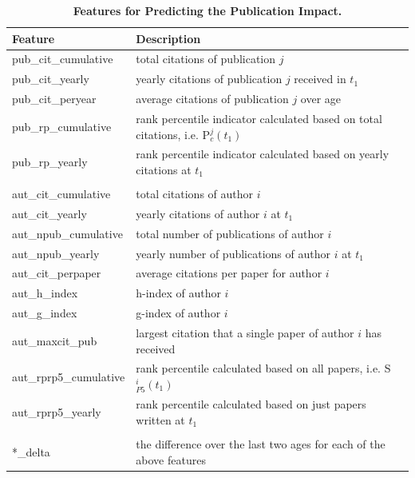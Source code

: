 \begin{refsection}
\begin{table}[htbp]
  \centering
    \begin{tabular}{l|l}
    Feature & Description \\
    \midrule
    pub\_cit\_cumulative & total citations of publication $j$ \\
    pub\_cit\_yearly & yearly citations of publication $j$ received in $t_1$ \\
    pub\_cit\_peryear & average citations of publication $j$ over age \\
    pub\_rp\_cumulative & rank percentile indicator calculated based on total citations, i.e. P$_c^{j}(t_1)$ \\
    pub\_rp\_yearly & rank percentile indicator calculated based on yearly citations at $t_1$\\
          &  \\
    aut\_cit\_cumulative          & total citations of author $i$ \\
    aut\_cit\_yearly          & yearly citations of author $i$ at $t_1$ \\
    aut\_npub\_cumulative & total number of publications of author $i$ \\
    aut\_npub\_yearly & yearly number of publications of author $i$ at $t_1$ \\
    aut\_cit\_perpaper & average citations per paper for author $i$  \\
    aut\_h\_index & h-index of author $i$  \\
    aut\_g\_index & g-index of author $i$ \\
    aut\_maxcit\_pub & largest citation that a single paper of author $i$ has received \\
    aut\_rprp5\_cumulative & rank percentile calculated based on all papers, i.e. S$_{P5}^{i}(t_1)$ \\
    aut\_rprp5\_yearly & rank percentile calculated based on just papers written at $t_1$ \\
          &  \\
    *\_delta & the difference over the last two ages for each of the above features \\
    \end{tabular}%
  \caption{{\bf Features for Predicting the Publication Impact.}}
  \label{tab:features_pubrp}%
\end{table}%


\end{refsection}
